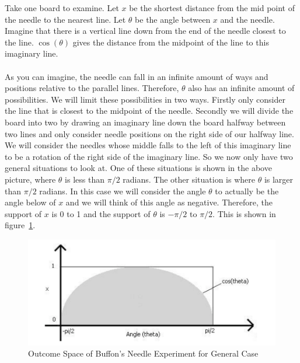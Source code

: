 \noindent
Take one board to examine. Let $x$ be the shortest distance from the mid point of the needle to the nearest line. Let $\theta$ be the angle between $x$ and the needle. Imagine that there is a vertical line down from the end of the needle closest to the line. $\cos(\theta)$ gives the distance from the midpoint of the line to this imaginary line.\\
\\
As you can imagine, the needle can fall in an infinite amount of ways and positions relative to the parallel lines. Therefore, $\theta$ also has an infinite amount of possibilities. We will limit these possibilities in two ways. Firstly only consider the line that is closest to the midpoint of the needle. Secondly we will divide the board into two by drawing an imaginary line down the board halfway between two lines and only consider needle positions on the right side of our halfway line. We will consider the needles whose middle falls to the left of this imaginary line to be a rotation of the right side of the imaginary line. So we now only have two general situations to look at. One of these situations is shown in the above picture, where $\theta$ is less than $\pi/2$ radians. The other situation is where $\theta$ is larger than $\pi/2$ radians. In this case we will consider the angle $\theta$ to actually be the angle below of $x$ and we will think of this angle as negative. Therefore, the support of $x$ is 0 to 1 and the support of $\theta$ is $-\pi/2$ to $\pi/2$. This is shown in figure~\ref{BGC}.\\


\begin{figure}[h]
\begin{center}
\includegraphics[width=12cm]{figures/BuffonNeedle_Cos}
\caption{Outcome Space of Buffon's Needle Experiment for General Case\label{BGC}}
\end{center}
\end{figure}


